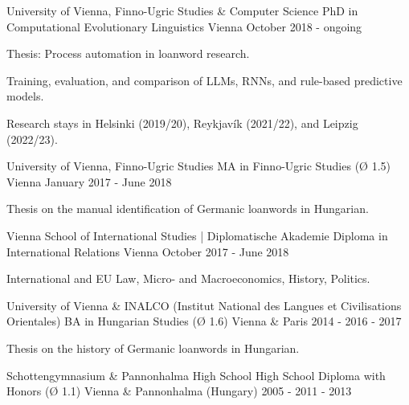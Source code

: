 

\begin{cventries}

  \cventry
    {University of Vienna, Finno-Ugric Studies \& Computer Science} %
    {PhD in Computational Evolutionary Linguistics} %
    {Vienna} %
    {October 2018 - ongoing} %
    {
      \begin{cvitems} %
        \item{Thesis: Process automation in loanword research.}
        \item{Training, evaluation, and comparison of LLMs, RNNs, and rule-based predictive models.}
        \item{Research stays in Helsinki (2019/20), Reykjavík (2021/22), and Leipzig (2022/23).}
      \end{cvitems}
    }

  \cventry
    {University of Vienna, Finno-Ugric Studies} %
    {MA in Finno-Ugric Studies (Ø 1.5)} %
    {Vienna} %
    {January 2017 - June 2018} %
    {
      \begin{cvitems} %
        \item{Thesis on the manual identification of Germanic loanwords in Hungarian.}
      \end{cvitems}
    }

  \cventry
    {Vienna School of International Studies | Diplomatische Akademie} %
    {Diploma in International Relations} %
    {Vienna} %
    {October 2017 - June 2018} %
    {
    \begin{cvitems} %
        \item{International and EU Law, Micro- and Macroeconomics, History, Politics.}
      \end{cvitems}
    }
    
  \cventry
    {University of Vienna \& INALCO (Institut National des Langues et Civilisations Orientales)} %
    {BA in Hungarian Studies (Ø 1.6)} %
    {Vienna \& Paris} %
    {2014 - 2016 - 2017} %
    {
      \begin{cvitems} %
        \item{Thesis on the history of Germanic loanwords in Hungarian.}
      \end{cvitems}
    }
        
  \cventry
    {Schottengymnasium \& Pannonhalma High School} %
    {High School Diploma with Honors (Ø 1.1)} %
    {Vienna \& Pannonhalma (Hungary)} %
    {2005 - 2011 - 2013} %
    {}
\end{cventries}
